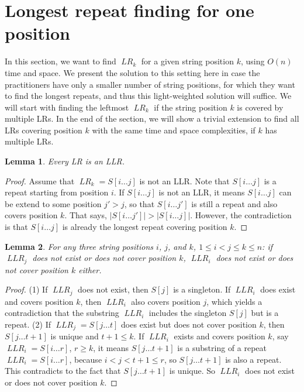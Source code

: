 \documentclass[preprint]{elsarticle}
\newtheorem{lemma}{Lemma}[section]
\DeclareMathOperator{\lr}{\mathit{LR}}
\DeclareMathOperator{\llr}{\mathit{LLR}}
\begin{document}
\section{Longest repeat finding for one position}   
\label{sec:one}
In this section, we want to find $\lr_k$ for a given string position
$k$, using $O(n)$ time and space.  We present the solution to this
setting
here in 
case the practitioners have only a smaller number of 
string positions, for which they want to find the longest repeats, 
and thus this light-weighted solution will suffice.
We will start with finding the leftmost $\lr_k$ if the string position
$k$ is covered by multiple LRs. In the end of the section, we will
show a trivial extension to find all LRs covering position $k$ with
the same time and space complexities, if $k$ has multiple LRs.

\begin{lemma}
\label{lem:lr-llr}
Every LR is an LLR.
\end{lemma}

\begin{proof}
Assume that $\lr_k=S[i\ldots j]$ is not an LLR. Note that $S[i\ldots
j]$ is a repeat starting from position $i$. If $S[i\ldots j]$ is not
an LLR, it means $S[i\ldots j]$ can be extend to some position
$j' > j$, so that $S[i\ldots j']$ is still a repeat and  also covers
position $k$. That says, $|S[i\ldots j']| > |S[i\ldots j]|$.
However, the contradiction is that $S[i\ldots j]$ is already the longest repeat
covering position $k$. 
\end{proof}

\begin{lemma}
\label{lem:llr-cover}
For any three string positions $i$, $j$, and $k$, $1\leq i < j \leq k
\leq n$: if
$\llr_j$ does not exist or does not cover position $k$, $\llr_i$ does
not exist or does not cover position $k$ either.
\end{lemma}

\begin{proof}
  (1) If $\llr_j$ does not exist, then $S[j]$ is a singleton.  If
  $\llr_i$ does exist and covers position $k$, then $\llr_i$ also covers
 position $j$, which yields a contradiction that 
  the substring $\llr_i$ includes the singleton $S[j]$ but is a repeat. 
(2) If $\llr_j=S[j\ldots t]$ does exist but does not cover position
  $k$, then $S[j\ldots t+1]$ is unique and $t+1 \leq k$. If $\llr_i$
  exists and covers position $k$, say $\llr_i = S[i\ldots r]$, 
  $r\geq k$, it means $S[j\ldots t+1]$ is a substring of a repeat
  $\llr_i=S[i\ldots r]$, because $i<j<t+1 \leq r$, so $S[j\ldots t+1]$
  is also a repeat. This contradicts to the fact that
  $S[j\ldots t+1]$ is unique. So   $\llr_i$ does not exist or does not
  cover position $k$. 
\end{proof}
\end{document}
